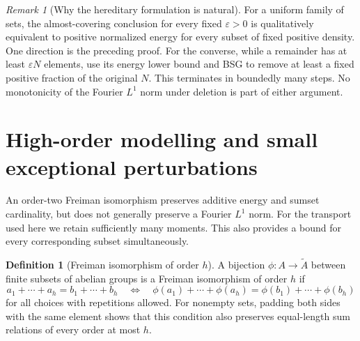 \documentclass[11pt,reqno]{amsart}
\numberwithin{equation}{section}
\theoremstyle{definition}
\newtheorem{definition}[theorem]{Definition}
\theoremstyle{remark}
\newtheorem{remark}[theorem]{Remark}
\newcommand{\eps}{\varepsilon}
\begin{document}
\begin{remark}[Why the hereditary formulation is natural]
For a uniform family of sets, the almost-covering conclusion for every
fixed $\eps>0$ is qualitatively equivalent to positive normalized
energy for every subset of fixed positive density. One direction is
the preceding proof. For the converse, while a remainder has at least
$\eps N$ elements, use its energy lower bound and BSG to remove at
least a fixed positive fraction of the original $N$. This terminates
in boundedly many steps. No monotonicity of the Fourier $L^1$ norm under
deletion is part of either argument.
\end{remark}

\section{High-order modelling and small exceptional perturbations}
\label{sec:transport}

An order-two Freiman isomorphism preserves additive energy and sumset
cardinality, but does not generally preserve a Fourier $L^1$ norm.
For the transport used here we retain sufficiently many moments. This
also provides a bound for every corresponding subset simultaneously.

\begin{definition}[Freiman isomorphism of order $h$]
A bijection $\phi:A\to\widetilde A$ between finite subsets of abelian
groups is a Freiman isomorphism of order $h$ if
\[
 a_1+\cdots+a_h=b_1+\cdots+b_h
 \quad\Longleftrightarrow\quad
 \phi(a_1)+\cdots+\phi(a_h)=\phi(b_1)+\cdots+\phi(b_h)
\]
for all choices with repetitions allowed. For nonempty sets, padding
both sides with the same element shows that this condition also
preserves equal-length sum relations of every order at most $h$.
\end{definition}
\end{document}

